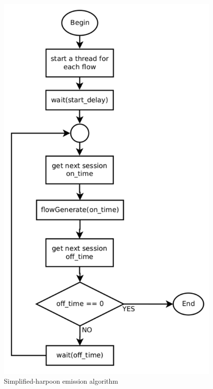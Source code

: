 \begin{figure}[ht!]
	\centering
	\includegraphics[width=\linewidth]{figures/alg-simplified-harpoon}
	\caption{Simplified-harpoon emission algorithm}
	\label{fig:alg-simplified-harpoon}
\end{figure}


